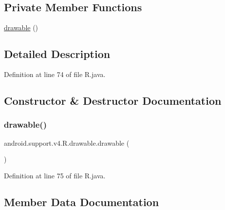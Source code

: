 \subsection*{Private Member Functions}
\begin{DoxyCompactItemize}
\item 
\mbox{\hyperlink{classandroid_1_1support_1_1v4_1_1_r_1_1drawable_ae4c6c8c6bc940c55d61429f83274c386}{drawable}} ()
\end{DoxyCompactItemize}


\subsection{Detailed Description}


Definition at line 74 of file R.\+java.



\subsection{Constructor \& Destructor Documentation}
\mbox{\label{classandroid_1_1support_1_1v4_1_1_r_1_1drawable_ae4c6c8c6bc940c55d61429f83274c386}} 
\subsubsection{\texorpdfstring{drawable()}{drawable()}}
{\footnotesize\ttfamily android.\+support.\+v4.\+R.\+drawable.\+drawable (\begin{DoxyParamCaption}{ }\end{DoxyParamCaption})\hspace{0.3cm}{\ttfamily [private]}}



Definition at line 75 of file R.\+java.


\begin{DoxyCode}{0}

\end{DoxyCode}


\subsection{Member Data Documentation}
\mbox{\label{classandroid_1_1support_1_1v4_1_1_r_1_1drawable_a1c5ea12cd4bf083ceae928a72012a29d}} 
